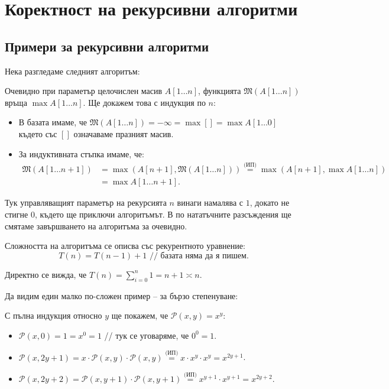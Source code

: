 \chapter{Коректност на рекурсивни алгоритми}

\section{Примери за рекурсивни алгоритми}

Нека разгледаме следният алгоритъм:


Очевидно при параметър целочислен масив $A[1 \dots n]$, функцията $\mathfrak{M}(A[1 \dots n])$ връща $\max A[1 \dots n]$.
Ще докажем това с индукция по $n$:
\begin{itemize}
    \item В базата имаме, че $\mathfrak{M}(A[1 \dots n]) = -\infty = \max [] = \max A[1 \dots 0]$ където със $[]$ означаваме празният масив.
    \item За индуктивната стъпка имаме, че:
          \begin{align*}
              \mathfrak{M}(A[1 \dots n + 1]) & = \max(A[n + 1], \mathfrak{M}(A[1 \dots n])) \stackrel{\text{(ИП)}}{=} \max(A[n + 1], \max A[1 \dots n]) \\
                                             & = \max A[1 \dots n + 1].
          \end{align*}
\end{itemize}

Тук управляващият параметър на рекурсията $n$ винаги намалява с $1$, докато не стигне $0$, където ще приключи алгоритъмът.
В по нататъчните разсъждения ще смятаме завършването на алгоритъма за очевидно.

Сложността на алгоритъма се описва със рекурентното уравнение:
\[
    T(n) = T(n - 1) + 1 \text{ // базата няма да я пишем}.
\]

Директно се вижда, че $T(n) = \sum\limits_{i = 0}^n 1 = n + 1 \asymp n$.

Да видим един малко по-сложен пример -- за бързо степенуване:


С пълна индукция относно $y$ ще покажем, че $\mathcal{P}(x, y) = x^y$:
\begin{itemize}
    \item $\mathcal{P}(x, 0) = 1 = x^0 = 1$ // тук се уговаряме, че $0^0 = 1$.
    \item $\mathcal{P}(x, 2y + 1) = x \cdot \mathcal{P}(x, y) \cdot \mathcal{P}(x, y) \stackrel{\text{(ИП)}}{=} x \cdot x^y \cdot x^y = x^{2y + 1}$.
    \item $\mathcal{P}(x, 2y + 2) = \mathcal{P}(x, y + 1) \cdot \mathcal{P}(x, y + 1) \stackrel{\text{(ИП)}}{=} x^{y + 1} \cdot x^{y + 1} = x^{2y + 2}$.
\end{itemize}

